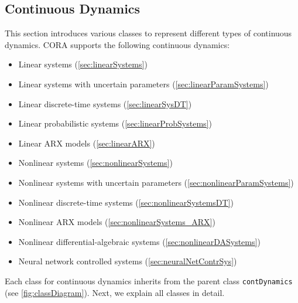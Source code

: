 
\subsection{Continuous Dynamics} \label{sec:continuousDynamics}

This section introduces various classes to represent different types of continuous dynamics. CORA supports the following continuous dynamics:
\begin{itemize}
    \item Linear systems (\cref{sec:linearSystems})
    \item Linear systems with uncertain parameters (\cref{sec:linearParamSystems})
    \item Linear discrete-time systems (\cref{sec:linearSysDT})
    \item Linear probabilistic systems (\cref{sec:linearProbSystems})
    \item Linear ARX models (\cref{sec:linearARX})
    \item Nonlinear systems (\cref{sec:nonlinearSystems})
    \item Nonlinear systems with uncertain parameters (\cref{sec:nonlinearParamSystems})
    \item Nonlinear discrete-time systems (\cref{sec:nonlinearSystemsDT})
    \item Nonlinear ARX models (\cref{sec:nonlinearSystems_ARX})
    \item Nonlinear differential-algebraic systems (\cref{sec:nonlinearDASystems})
    \item Neural network controlled systems (\cref{sec:neuralNetContrSys})
\end{itemize}
Each class for continuous dynamics inherits from the parent class \texttt{contDynamics} (see \cref{fig:classDiagram}). Next, we explain all classes in detail.











